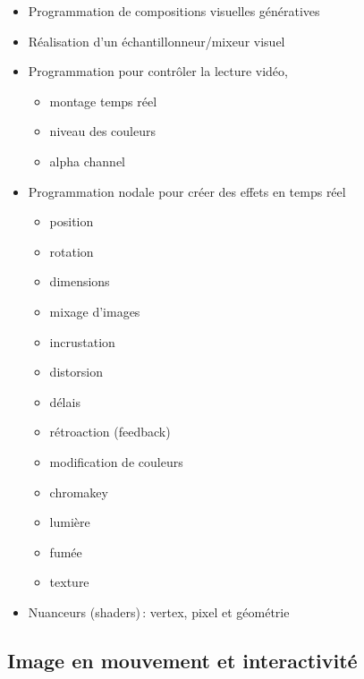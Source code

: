 \documentclass[
]{book}
\providecommand{\tightlist}{%
  \setlength{\itemsep}{0pt}\setlength{\parskip}{0pt}}
\begin{document}
\begin{itemize}
\tightlist
\item
  Programmation de compositions visuelles génératives
\item
  Réalisation d'un échantillonneur/mixeur visuel
\item
  Programmation pour contrôler la lecture vidéo,

  \begin{itemize}
  \tightlist
  \item
    montage temps réel
  \item
    niveau des couleurs
  \item
    alpha channel\\
  \end{itemize}
\item
  Programmation nodale pour créer des effets en temps réel

  \begin{itemize}
  \tightlist
  \item
    position
  \item
    rotation
  \item
    dimensions
  \item
    mixage d'images
  \item
    incrustation
  \item
    distorsion
  \item
    délais
  \item
    rétroaction (feedback)
  \item
    modification de couleurs
  \item
    chromakey
  \item
    lumière
  \item
    fumée
  \item
    texture
  \end{itemize}
\item
  Nuanceurs (shaders)\,: vertex, pixel et géométrie
\end{itemize}

\hypertarget{image-en-mouvement-et-interactivituxe9}{%
\subsection{Image en mouvement et interactivité}\label{image-en-mouvement-et-interactivituxe9}}
\end{document}

